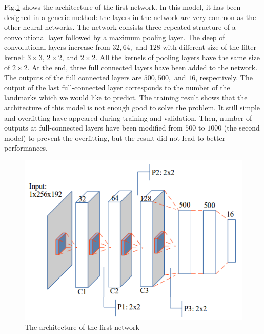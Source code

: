 \documentclass[conference]{IEEEtran}
\begin{document}
Fig.\ref{figarch0} shows the architecture of the first network. In this model, it has been designed in a generic method: the layers in the network are very common as the other neural networks. The network consists three repeated-structure of a convolutional layer followed by a maximum pooling layer. The deep of convolutional layers increase from $32, 64,$ and $128$ with different size of the filter kernel: $3 \times 3$, $2 \times 2$, and $2 \times 2$. All the kernels of pooling layers have the same size of $2 \times 2$.  At the end, three full connected layers have been added to the network. The outputs of the full connected layers are $500, 500,$ and $16$, respectively. The output of the last full-connected layer corresponds to the number of the landmarks which we would like to predict. The training result shows that the architecture of this model is not enough good to solve the problem. It still simple and overfitting have appeared during training and validation. Then, number of outputs at full-connected layers have been modified from $500$ to $1000$ (the second model) to prevent the overfitting, but the result did not lead to better performances. 

\begin{figure}[htbp]
	\centerline{\includegraphics[scale=0.45]{images/architecture1}}
	\caption{The architecture of the first network}
	\label{figarch0}
\end{figure}
\end{document}
